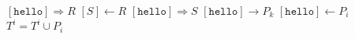 \documentclass{article}
\begin{document}
\pagestyle{empty}

\newcommand{\send}{\Rightarrow}
\newcommand{\sendto}{\rightarrow}
\algrenewcommand{}

\begin{algorithmic}
  \State $[\mathtt{hello}] \send R$
  \State $[S] \gets R$
  \State $[\mathtt{hello}] \send S$
  \State $[\mathtt{hello}]\sendto P_k$
  \EndFor
  \EndProcedure
  \newline
  \State $[\mathtt{hello}] \gets P_i$
  \State $T^i = T^i \cup P_i$
  \EndWhile
  \EndProcedure
  
\end{algorithmic}
\end{document}

